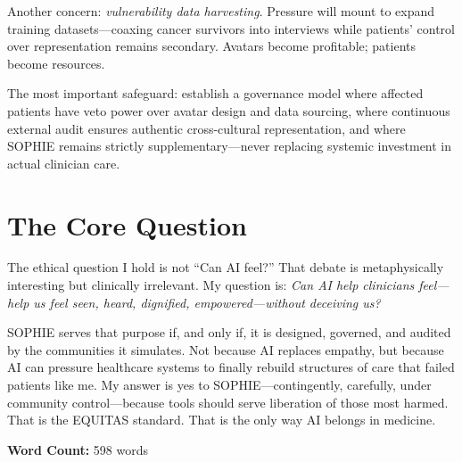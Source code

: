 \documentclass[12pt,twoside]{article}
\begin{document}
Another concern: \emph{vulnerability data harvesting}. Pressure will mount to expand training datasets—coaxing cancer survivors into interviews while patients' control over representation remains secondary. Avatars become profitable; patients become resources.

The most important safeguard: establish a governance model where affected patients have veto power over avatar design and data sourcing, where continuous external audit ensures authentic cross-cultural representation, and where SOPHIE remains strictly supplementary—never replacing systemic investment in actual clinician care.

\section*{The Core Question}

The ethical question I hold is not \enquote{Can AI feel?} That debate is metaphysically interesting but clinically irrelevant. My question is: \emph{Can AI help clinicians feel—help us feel seen, heard, dignified, empowered—without deceiving us?}

SOPHIE serves that purpose if, and only if, it is designed, governed, and audited by the communities it simulates. Not because AI replaces empathy, but because AI can pressure healthcare systems to finally rebuild structures of care that failed patients like me. My answer is yes to SOPHIE—contingently, carefully, under community control—because tools should serve liberation of those most harmed. That is the EQUITAS standard. That is the only way AI belongs in medicine.

\vfill
\noindent\centering\footnotesize\textbf{Word Count:} 598 words
\end{document}
